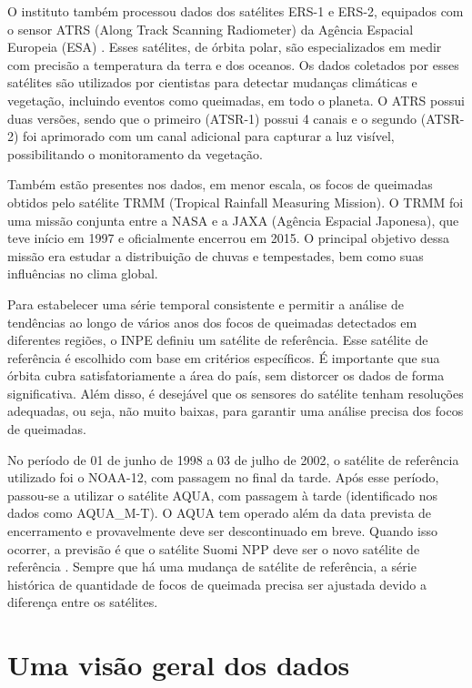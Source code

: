 \documentclass[cic,tc]{iiufrgs}
\begin{document}
O instituto também processou dados dos satélites ERS-1 e ERS-2, equipados com o sensor ATRS (Along Track Scanning Radiometer) da Agência Espacial Europeia (ESA) \cite{EmbrapaSatelites}. Esses satélites, de órbita polar, são especializados em medir com precisão a temperatura da terra e dos oceanos. Os dados coletados por esses satélites são utilizados por cientistas para detectar mudanças climáticas e vegetação, incluindo eventos como queimadas, em todo o planeta. O ATRS possui duas versões, sendo que o primeiro (ATSR-1) possui 4 canais e o segundo (ATSR-2) foi aprimorado com um canal adicional para capturar a luz visível, possibilitando o monitoramento da vegetação.  \par

Também estão presentes nos dados, em menor escala, os focos de queimadas obtidos pelo satélite TRMM (Tropical Rainfall Measuring Mission). O TRMM foi uma missão conjunta entre a NASA e a JAXA (Agência Espacial Japonesa), que teve início em 1997 e oficialmente encerrou em 2015. O principal objetivo dessa missão era estudar a distribuição de chuvas e tempestades, bem como suas influências no clima global. \par

Para estabelecer uma série temporal consistente e permitir a análise de tendências ao longo de vários anos dos focos de queimadas detectados em diferentes regiões, o INPE definiu um satélite de referência. Esse satélite de referência é escolhido com base em critérios específicos. É importante que sua órbita cubra satisfatoriamente a área do país, sem distorcer os dados de forma significativa. Além disso, é desejável que os sensores do satélite tenham resoluções adequadas, ou seja, não muito baixas, para garantir uma análise precisa dos focos de queimadas.

No período de 01 de junho de 1998 a 03 de julho de 2002, o satélite de referência utilizado foi o NOAA-12, com passagem no final da tarde. Após esse período, passou-se a utilizar o satélite AQUA, com passagem à tarde (identificado nos dados como AQUA\_M-T). O AQUA tem operado além da data prevista de encerramento e provavelmente deve ser descontinuado em breve. Quando isso ocorrer, a previsão é que o satélite Suomi NPP deve ser o novo satélite de referência \citep{PerguntasFrequentesINPE}. Sempre que há uma mudança de satélite de referência, a série histórica de quantidade de focos de queimada precisa ser ajustada devido a diferença entre os satélites.
\section{Uma visão geral dos dados}
\end{document}
